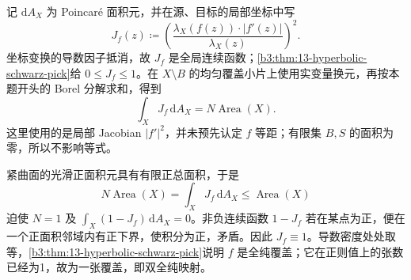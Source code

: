 \begin{solution}
记 \(\mathrm dA_X\) 为 Poincaré 面积元，并在源、目标的局部坐标中写
\[
 J_f(z)\coloneqq
 \left(\frac{\lambda_X(f(z))\cdot|f'(z)|}{\lambda_X(z)}\right)^2.
\]
坐标变换的导数因子抵消，故 \(J_f\) 是全局连续函数；\cref{b3:thm:13-hyperbolic-schwarz-pick}给 \(0\le J_f\le1\)。在 \(X\setminus B\) 的均匀覆盖小片上使用实变量换元，再按本题开头的 Borel 分解求和，得到
\[
 \int_X J_f\,\mathrm dA_X=N\operatorname{Area}(X).
\]
这里使用的是局部 Jacobian \(|f'|^2\)，并未预先认定 \(f\) 等距；有限集 \(B,S\) 的面积为零，所以不影响等式。

紧曲面的光滑正面积元具有有限正总面积，于是
\[
 N\operatorname{Area}(X)=\int_X J_f\,\mathrm dA_X
 \le\operatorname{Area}(X)
\]
迫使 \(N=1\) 及 \(\int_X(1-J_f)\,\mathrm dA_X=0\)。非负连续函数 \(1-J_f\) 若在某点为正，便在一个正面积邻域内有正下界，使积分为正，矛盾。因此 \(J_f\equiv1\)。导数密度处处取等，\cref{b3:thm:13-hyperbolic-schwarz-pick}说明 \(f\) 是全纯覆盖；它在正则值上的张数已经为1，故为一张覆盖，即双全纯映射。
\end{solution}
